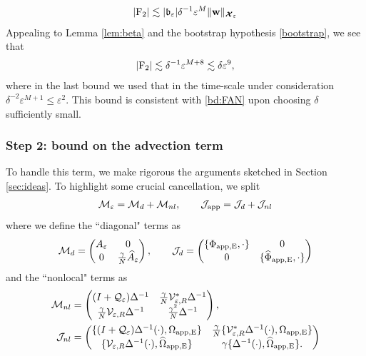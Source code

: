 \documentclass[11pt,reqno,a4paper]{amsart}
\def\eps{\varepsilon}
\newcommand{\cJ}{\mathcal{J}}
\newcommand{\cM}{\mathcal{M}}
\newcommand{\cQ}{\mathcal{Q}}
\newcommand{\cV}{\mathcal{V}}
\newcommand{\cX}{\mathcal{X}}
\newcommand{\1}{\mathbbm{1}}
\theoremstyle{definition}
\theoremstyle{definition}
\numberwithin{equation}{section}
\begin{document}
\begin{align}
    |{\rm F}_2|\lesssim |\mathfrak{b}_{\eps}|\delta^{-1}\eps^{M}\|\mathbf w\|_{\boldsymbol{\cX}_{\eps}}
\end{align}
    Appealing to Lemma \ref{lem:beta} and the bootstrap hypothesis \cref{bootstrap}, we see that 
    \begin{align}
    \label{bd:F2}
        |{\rm F}_2|\lesssim \delta^{-1}\eps^{M+8}\lesssim \delta \eps^9,
    \end{align}
    where in the last bound we used that in the time-scale under consideration $\delta^{-2}\eps^{M+1}\leq \eps^2$. This bound is consistent with \cref{bd:FAN} upon choosing $\delta$ sufficiently small.
     

\subsubsection*{\textbf{Step 2: bound on the advection term}} To handle this term, we make rigorous the arguments sketched in Section \ref{sec:ideas}. To highlight some crucial cancellation, we split
\begin{align}
\cM_\eps =\cM_{d}+\cM_{nl}, \qquad \cJ_{\rm app}=\cJ_{d}+\cJ_{nl}
\end{align}
where we define the ``diagonal" terms as
\begin{align}
    \cM_d=\begin{pmatrix}
        A_{\eps} & 0\\
        0 & \frac{\gamma}{N}\widehat{A}_\eps
    \end{pmatrix}, \qquad \cJ_d=\begin{pmatrix}
        \{\Phi_{\rm app,E}, \cdot\} & 0\\
        0 & \{\widehat{\Phi}_{\rm app,E}, \cdot\}
    \end{pmatrix}
\end{align}
and the ``nonlocal" terms as
\begin{align}
    \cM_{nl}&=\begin{pmatrix}
        (I+\cQ_{\eps})\Delta^{-1} & \frac{\gamma}{N}\cV_{\eps,R}^*\Delta^{-1}\\
        \frac{\gamma}{N}\cV_{\eps,R}\Delta^{-1} & \frac{\gamma^2}{N}\Delta^{-1}
    \end{pmatrix}, \\
    \cJ_{nl}&=\begin{pmatrix}
        \{(I+\cQ_{\eps})\Delta^{-1}(\cdot), \Omega_{\rm app,E}\} & \frac{\gamma}{N}\{\cV_{\eps,R}^*\Delta^{-1}(\cdot), \Omega_{\rm app,E}\}
        \\
  \{\cV_{\eps,R}\Delta^{-1}(\cdot), \widehat{\Omega}_{\rm app,E}\} & \gamma\{\Delta^{-1}(\cdot),\widehat{\Omega}_{\rm app,E}\}.
    \end{pmatrix}
\end{align}
\end{document}

